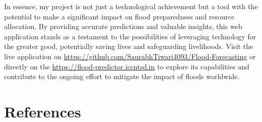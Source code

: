 \documentclass[a4paper,12pt]{report}
\begin{document}
In essence, my project is not just a technological achievement but a tool with the potential to make a significant impact on flood preparedness and resource allocation. By providing accurate predictions and valuable insights, this web application stands as a testament to the possibilities of leveraging technology for the greater good, potentially saving lives and safeguarding livelihoods. Visit the live application on \href{https://github.com/SaurabhTiwari4093/Flood-Forecasting}{https://github.com/SaurabhTiwari4093/Flood-Forecasting} or directly on the \href{https://flood-predictor.iccntsd.in}{https://flood-predictor.iccntsd.in} to explore its capabilities and contribute to the ongoing effort to mitigate the impact of floods worldwide.


\chapter{References}
\end{document}
